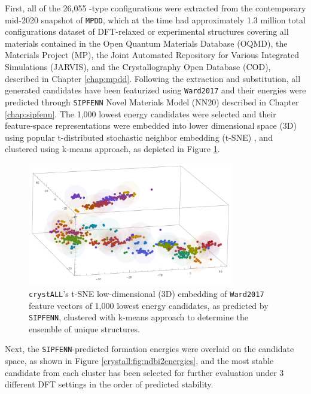 First, all of the 26,055 -type configurations were extracted from the contemporary mid-2020 snapshot of \texttt{MPDD}, which at the time had approximately 1.3 million total configurations dataset of DFT-relaxed or experimental structures covering all materials contained in the Open Quantum Materials Database (OQMD), the Materials Project (MP), the Joint Automated Repository for Various Integrated Simulations (JARVIS), and the Crystallography Open Database (COD), described in Chapter \ref{chap:mpdd}. Following the extraction and substitution, all generated candidates have been featurized using \texttt{Ward2017} \cite{Ward2017IncludingTessellations} and their energies were predicted through \texttt{SIPFENN} Novel Materials Model (NN20) described in Chapter \ref{chap:sipfenn}. The 1,000 lowest energy candidates were selected and their feature-space representations were embedded into lower dimensional space (3D) using popular t-distributed stochastic neighbor embedding (t-SNE) \cite{HintonStochasticEmbedding}, and clustered using k-means approach, as depicted in Figure \ref{crystall:fig:ndbi2clusters}.

\begin{figure}[H]
    \centering
    \includegraphics[width=0.8\textwidth]{crystall/crystall_NdBi2.png}
    \caption{\texttt{crystALL}'s t-SNE low-dimensional (3D) embedding of \texttt{Ward2017} feature vectors of 1,000 lowest energy  candidates, as predicted by \texttt{SIPFENN}, clustered with k-means approach to determine the ensemble of unique structures.}
    \label{crystall:fig:ndbi2clusters}
\end{figure}


Next, the \texttt{SIPFENN}-predicted formation energies were overlaid on the candidate space, as shown in Figure \ref{crystall:fig:ndbi2energies}, and the most stable candidate from each cluster has been selected for further evaluation under 3 different DFT settings in the order of predicted stability.


